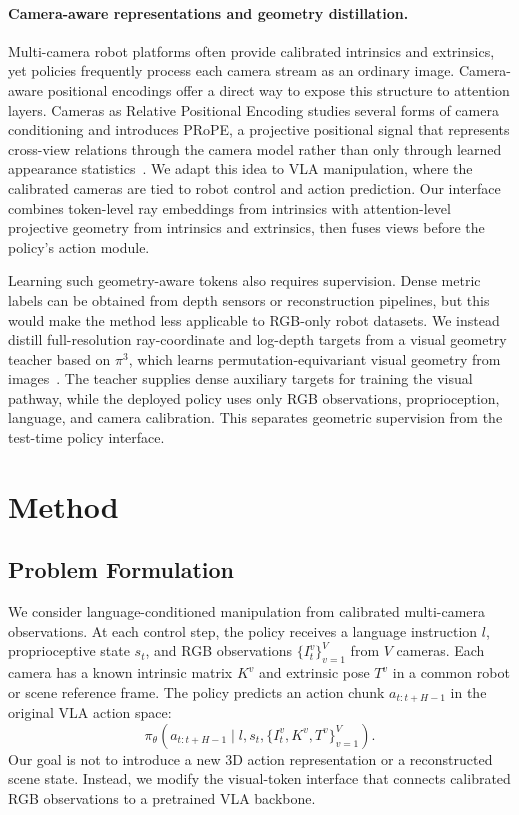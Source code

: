 \documentclass{article}
\begin{document}
\paragraph{Camera-aware representations and geometry distillation.}
Multi-camera robot platforms often provide calibrated intrinsics and extrinsics, yet policies frequently process each camera stream as an ordinary image. Camera-aware positional encodings offer a direct way to expose this structure to attention layers. Cameras as Relative Positional Encoding studies several forms of camera conditioning and introduces PRoPE, a projective positional signal that represents cross-view relations through the camera model rather than only through learned appearance statistics~\citep{li2025cameras}. We adapt this idea to VLA manipulation, where the calibrated cameras are tied to robot control and action prediction. Our interface combines token-level ray embeddings from intrinsics with attention-level projective geometry from intrinsics and extrinsics, then fuses views before the policy's action module.

Learning such geometry-aware tokens also requires supervision. Dense metric labels can be obtained from depth sensors or reconstruction pipelines, but this would make the method less applicable to RGB-only robot datasets. We instead distill full-resolution ray-coordinate and log-depth targets from a visual geometry teacher based on $\pi^3$, which learns permutation-equivariant visual geometry from images~\citep{wang2025pi3}. The teacher supplies dense auxiliary targets for training the visual pathway, while the deployed policy uses only RGB observations, proprioception, language, and camera calibration. This separates geometric supervision from the test-time policy interface.



\section{Method}
\label{sec:method}

\subsection{Problem Formulation}
We consider language-conditioned manipulation from calibrated multi-camera observations. At each control step, the policy receives a language instruction $l$, proprioceptive state $s_t$, and RGB observations $\{I_t^v\}_{v=1}^{V}$ from $V$ cameras. Each camera has a known intrinsic matrix $K^v$ and extrinsic pose $T^v$ in a common robot or scene reference frame. The policy predicts an action chunk $a_{t:t+H-1}$ in the original VLA action space:
\begin{equation}
    \pi_\theta(a_{t:t+H-1}\mid l, s_t, \{I_t^v,K^v,T^v\}_{v=1}^{V}) .
\end{equation}
Our goal is not to introduce a new 3D action representation or a reconstructed scene state. Instead, we modify the visual-token interface that connects calibrated RGB observations to a pretrained VLA backbone.
\end{document}
